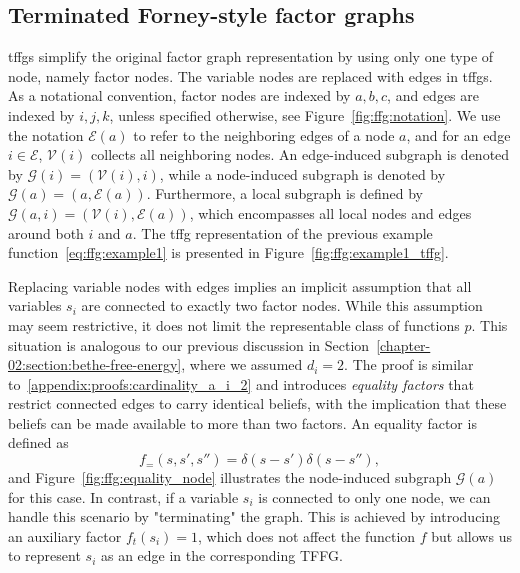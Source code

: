 \subsection{Terminated Forney-style factor graphs}

\Acp{tffg} simplify the original factor graph
representation by using only one type of node, namely factor nodes.
The variable nodes are replaced with edges in \acp{tffg}.
As a notational convention, factor nodes are indexed by $a, b, c$, and edges are indexed by
$i, j, k$, unless specified otherwise, see Figure~\ref{fig:ffg:notation}.
We use the notation $\mathcal{E}(a)$ to refer to the neighboring edges of a node $a$, and for
an edge $i \in \mathcal{E}$, $\mathcal{V}(i)$ collects all neighboring nodes.
An edge-induced subgraph is denoted by $\mathcal{G}(i) = (\mathcal{V}(i), i)$, while a
node-induced subgraph is denoted by $\mathcal{G}(a) = (a, \mathcal{E}(a))$.
Furthermore, a local subgraph is defined by $\mathcal{G}(a, i) = (\mathcal{V}(i),
  \mathcal{E}(a))$, which encompasses all local nodes and edges around both $i$ and $a$.
The \ac{tffg} representation of the previous example function~\eqref{eq:ffg:example1} is presented
in Figure~\ref{fig:ffg:example1_tffg}.

Replacing variable nodes with edges implies an implicit assumption that all variables $s_i$
are connected to exactly two factor nodes.
While this assumption may seem restrictive, it does not limit the representable class of
functions $p$.
This situation is analogous to our previous discussion in
Section~\ref{chapter-02:section:bethe-free-energy}, where we assumed $d_i = 2$.
The proof is similar to~\ref{appendix:proofs:cardinality_a_i_2} and introduces
\textit{equality factors} that restrict connected edges to carry identical beliefs, with the
implication that these beliefs can be made available to more than two factors.
An equality factor is defined as \begin{equation}
    \label{eq:ffg:equality_node}
    f_{=}(s, s', s'') = \delta(s - s')\delta(s - s''),
    \end{equation} and Figure~\ref{fig:ffg:equality_node}
illustrates the node-induced subgraph $\mathcal{G}(a)$ for this case.
In contrast, if a variable $s_i$ is connected to only one node, we can handle this scenario by
"terminating" the graph.
This is achieved by introducing an auxiliary factor $f_t(s_i) = 1$, which does not affect the
function $f$ but allows us to represent $s_i$ as an edge in the corresponding TFFG.

